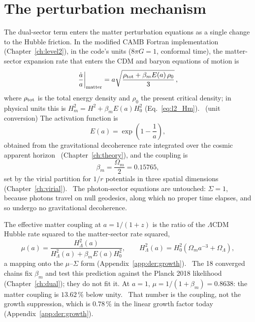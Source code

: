 \section{The perturbation mechanism}\label{sec:tw_mechanism}
The dual-sector term enters the matter perturbation equations as a single change to the Hubble friction. In the modified CAMB Fortran implementation
(Chapter~\ref{ch:level2}), in the code's units ($8\pi G=1$, conformal time), the matter-sector expansion rate that enters the CDM and baryon equations
of motion is
\begin{equation}
\frac{\dot a}{a}\bigg|_{\rm matter}=a\sqrt{\frac{\rho_{\rm tot}+\beta_mE(a)\,\rho_0}{3}}\,,
\label{eq:tw_adot}\end{equation}
where $\rho_{\rm tot}$ is the total energy density and $\rho_0$ the present critical density; in physical units this is
$H_m^2=H^2+\beta_mE(a)H_0^2$ (Eq.~\eqref{eq:l2_Hm}). \derived\ (unit conversion) The activation function is
\begin{equation}
E(a)=\exp\!\left(1-\frac1a\right),
\label{eq:tw_E}\end{equation}
obtained from the gravitational decoherence rate integrated over the cosmic apparent horizon~\cite{Jacobson1995,CaiKim2005} (Chapter~\ref{ch:theory}),
and the coupling is
\begin{equation}
\beta_m=\frac{\Omega_m}{2}=0.15765,
\label{eq:tw_beta}\end{equation}
set by the virial partition for $1/r$ potentials in three spatial dimensions (Chapter~\ref{ch:virial}). \prediction\ The photon-sector equations are
untouched: $\Sigma=1$, because photons travel on null geodesics, along which no proper time elapses, and so undergo no gravitational
decoherence. \interp

The effective matter coupling at $a=1/(1+z)$ is the ratio of the $\Lambda$CDM Hubble rate squared to the matter-sector rate squared,
\begin{equation}
\mu(a)=\frac{H^2_\Lambda(a)}{H^2_\Lambda(a)+\beta_mE(a)H_0^2},\qquad H^2_\Lambda(a)=H_0^2(\Omega_ma^{-3}+\Omega_\Lambda),
\label{eq:tw_mu}\end{equation}
a mapping onto the $\mu$--$\Sigma$ form (Appendix~\ref{app:der:growth}). \interp\ The 18 converged chains fix $\beta_m$ and test this prediction
against the Planck 2018 likelihood (Chapter~\ref{ch:dual}); they do not fit it. At $a=1$, $\mu=1/(1+\beta_m)=0.8638$: the matter coupling is
$13.62\,\%$ below unity. \calc\ That number is the coupling, not the growth suppression, which is $0.78\,\%$ in the linear growth factor today
(Appendix~\ref{app:der:growth}).

